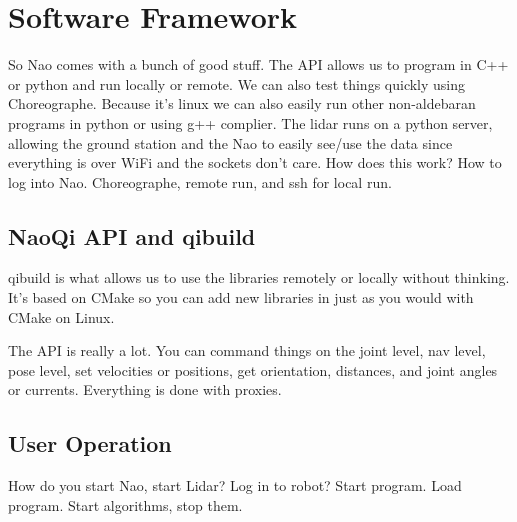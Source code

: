 \section{Software Framework}
So Nao comes with a bunch of good stuff. The API allows us to program in C++ or python and run locally or
remote. We can also test things quickly using Choreographe. Because it's linux we can also easily
run other non-aldebaran programs in python or using g++ complier.
The lidar runs on a python server, allowing the ground station and the Nao to easily see/use the data since
everything is over WiFi and the sockets don't care. How does this work?
How to log into Nao. Choreographe, remote run, and ssh for local run.

\subsection{NaoQi API and qibuild}
qibuild is what allows us to use the libraries remotely or locally without thinking. It's based on CMake
so you can add new libraries in just as you would with CMake on Linux.

The API is really a lot. You can command things on the joint level, nav level, pose level,
set velocities or positions, get orientation, distances, and joint angles or currents.
Everything is done with proxies.

\subsection{User Operation}
How do you start Nao, start Lidar? Log in to robot? Start program. Load program.
Start algorithms, stop them.
